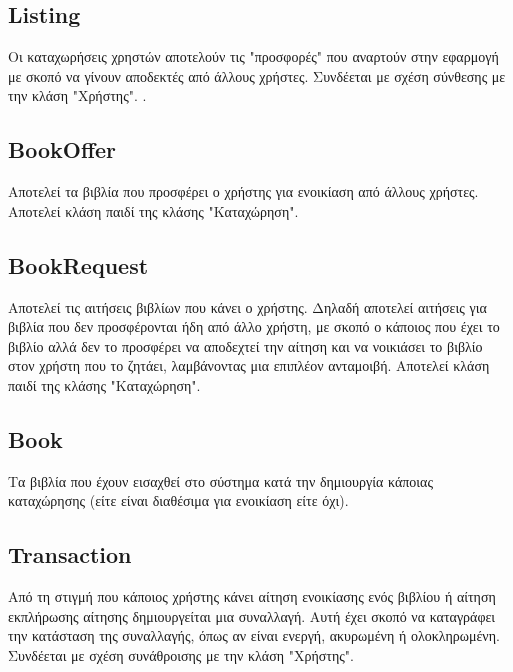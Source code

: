 \documentclass[12pt,a4paper]{article}
\begin{document}
\subsection{Listing}
Οι καταχωρήσεις χρηστών αποτελούν τις "προσφορές" που αναρτούν στην εφαρμογή με σκοπό να γίνουν αποδεκτές από άλλους χρήστες. Συνδέεται με σχέση σύνθεσης με την κλάση "Χρήστης".
.
\subsection{BookOffer}
Αποτελεί τα βιβλία που προσφέρει ο χρήστης για ενοικίαση από άλλους χρήστες. Αποτελεί κλάση παιδί της κλάσης "Καταχώρηση".

\subsection{BookRequest}
Αποτελεί τις αιτήσεις βιβλίων που κάνει ο χρήστης. Δηλαδή αποτελεί αιτήσεις για βιβλία που δεν προσφέρονται ήδη από άλλο χρήστη, με σκοπό ο κάποιος που έχει το βιβλίο αλλά δεν το προσφέρει να αποδεχτεί την αίτηση και να νοικιάσει το βιβλίο στον χρήστη που το ζητάει, λαμβάνοντας μια επιπλέον ανταμοιβή. Αποτελεί κλάση παιδί της κλάσης "Καταχώρηση".

\subsection{Book}
Τα βιβλία που έχουν εισαχθεί στο σύστημα κατά την δημιουργία κάποιας καταχώρησης (είτε είναι διαθέσιμα για ενοικίαση είτε όχι).

\subsection{Transaction}
Από τη στιγμή που κάποιος χρήστης κάνει αίτηση ενοικίασης ενός βιβλίου ή αίτηση εκπλήρωσης αίτησης δημιουργείται μια συναλλαγή. Αυτή έχει σκοπό να καταγράφει την κατάσταση της συναλλαγής, όπως αν είναι ενεργή, ακυρωμένη ή ολοκληρωμένη. Συνδέεται με σχέση συνάθροισης με την κλάση "Χρήστης".
\end{document}
